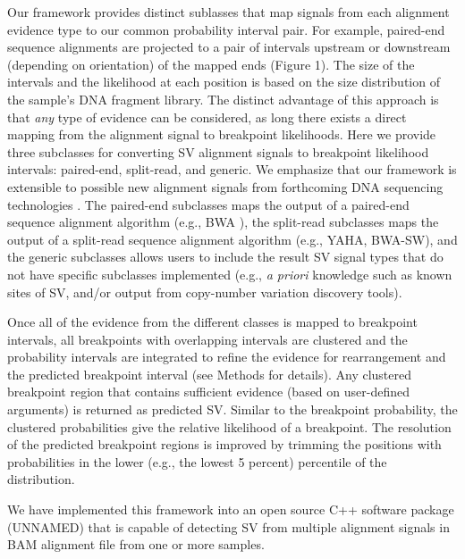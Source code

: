 \documentclass[11pt]{article}
\begin{document}
Our framework provides distinct sublasses that map signals from each alignment 
evidence type to our common probability interval pair.  For example, paired-end 
sequence alignments are projected to a pair of intervals upstream or downstream 
(depending on orientation) of the mapped ends (Figure 1).  The size of the 
intervals and the likelihood at each position is based on the size distribution
of the sample's DNA fragment library.  The distinct advantage of this approach
is that \emph{any} type of evidence can be considered, as long there exists
a direct mapping from the alignment signal to breakpoint likelihoods.
Here we provide three subclasses for converting SV alignment signals to breakpoint
likelihood intervals: paired-end, split-read, and generic.  We emphasize that
our framework is extensible to possible new alignment signals from forthcoming
DNA sequencing technologies \cite{OxfordNanopore}. The paired-end subclasses maps 
the output of a paired-end sequence alignment algorithm 
(e.g., BWA \cite{li2009a}), the split-read subclasses maps the output of a 
split-read sequence alignment algorithm (e.g., YAHA\cite{faust2012}, 
BWA-SW\cite{li2010}), and the generic subclasses allows users to include the result 
SV signal types that do not have specific subclasses implemented (e.g., 
\emph{a priori} knowledge such as known sites of SV, and/or output from 
copy-number variation discovery tools).

Once all of the evidence from the different classes is mapped to breakpoint
intervals, all breakpoints with overlapping intervals are clustered and 
the probability intervals are integrated to refine the evidence for 
rearrangement and the predicted breakpoint interval (see Methods for details).  
Any clustered breakpoint region that contains sufficient evidence (based on 
user-defined arguments) is returned as predicted SV.  
Similar to the breakpoint probability, the clustered probabilities give the 
relative likelihood of a breakpoint.  The resolution of the predicted breakpoint
regions is improved by trimming the positions with probabilities 
in the lower (e.g., the lowest 5 percent) percentile of the distribution.

We have implemented this framework into an open source C++ software package 
(UNNAMED) that is capable of detecting SV from multiple alignment signals in 
BAM alignment file from one or more samples.
\end{document}
